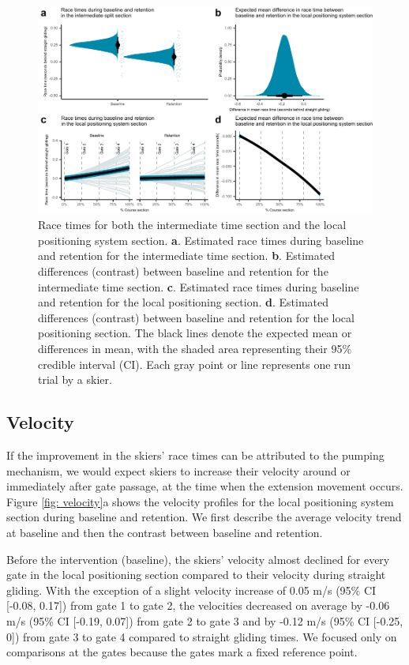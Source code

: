 \documentclass{article}
\begin{document}
\begin{figure}
    \centering
    \includegraphics[width=1\linewidth]{figurer/figure_racetime_3.pdf}
    \caption{Race times for both the intermediate time section and the local positioning system section. \textbf{a}. Estimated race times during baseline and retention for the intermediate time section. \textbf{b}. Estimated differences (contrast) between baseline and retention for the intermediate time section. \textbf{c}. Estimated race times during baseline and retention for the local positioning section. \textbf{d}. Estimated differences (contrast) between baseline and retention for the local positioning section. The black lines denote the expected mean or differences in mean, with the shaded area representing their 95\% credible interval (CI). Each gray point or line represents one run trial by a skier.}
    \label{fig: racetimes}
\end{figure}

\subsection{Velocity}
If the improvement in the skiers' race times can be attributed to the pumping mechanism, we would expect skiers to increase their velocity around or immediately after gate passage, at the time when the extension movement occurs.  Figure \ref{fig: velocity}a shows the velocity profiles for the local positioning system section during baseline and retention. We first describe the average velocity trend at baseline and then the contrast between baseline and retention.

Before the intervention (baseline), the skiers' velocity almost declined for every gate in the local positioning section compared to their velocity during straight gliding. With the exception of a slight velocity increase of 0.05 m/s (95\% CI [-0.08, 0.17]) from gate 1 to gate 2, the velocities decreased on average by -0.06 m/s (95\% CI [-0.19, 0.07]) from gate 2 to gate 3 and by -0.12 m/s (95\% CI [-0.25, 0]) from gate 3 to gate 4 compared to straight gliding times. We focused only on comparisons at the gates because the gates mark a fixed reference point. 
\end{document}
